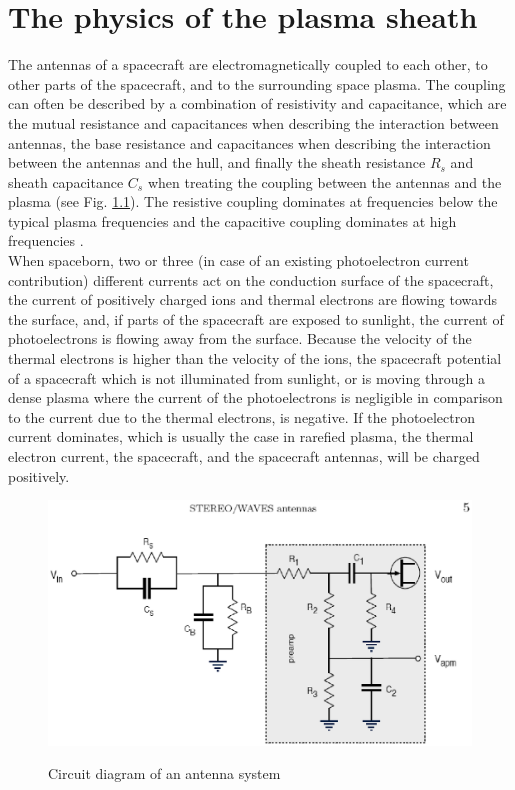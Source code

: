 \documentclass[a4paper,11pt]{thesis}
\begin{document}
\chapter{The physics of the plasma sheath}
The antennas of a spacecraft are electromagnetically coupled to each other, to other parts of the spacecraft, and to the surrounding space plasma. The coupling can often be described by a
combination of resistivity and capacitance, which are the mutual resistance and capacitances when describing the interaction between antennas, the base resistance and capacitances when describing the interaction between the antennas and the hull, and finally the sheath resistance $R_s$ and sheath capacitance $C_s$ when treating the coupling between the antennas and the plasma (see Fig. \ref{fig_schaltplan}). The resistive coupling dominates at frequencies below the typical plasma frequencies and the capacitive coupling  dominates at high frequencies \cite{gurnett98}. \\

When spaceborn, two or three (in case of an existing photoelectron current contribution) different currents act on the conduction surface of the spacecraft, the current of positively charged ions and thermal electrons are flowing towards the surface, and, if parts of the spacecraft are exposed to sunlight, the current of photoelectrons is flowing away from the surface. Because the velocity of the thermal electrons is higher than the velocity of the ions, the spacecraft potential of a spacecraft which is not illuminated from sunlight, or is moving through a dense plasma where the current of the photoelectrons is negligible in comparison to the current due to the thermal electrons, is negative. If the photoelectron current dominates, which is usually the case in rarefied plasma, the thermal electron current, the spacecraft, and the spacecraft antennas, will be charged positively.

\begin{figure}
\includegraphics[width=12cm]{DissPics/schaltplan.eps}\\
\caption{Circuit diagram of an antenna system \cite{bale07}}
\label{fig_schaltplan}
\end{figure}
\end{document}
